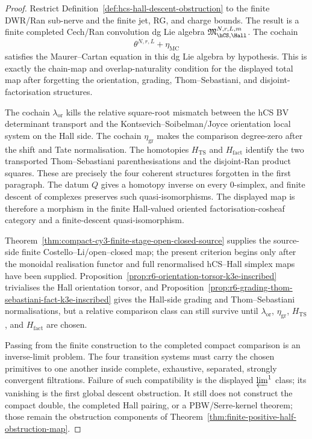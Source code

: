 \begin{proof}
Restrict
Definition~\ref{def:hcs-hall-descent-obstruction} to the finite
DWR/Ran sub-nerve and the finite jet, RG, and charge bounds. The result
is a finite completed Cech/Ran convolution dg Lie algebra
$\mathfrak M_{\hCS,\Hall}^{N,r,L,m}$. The cochain
\[
 \theta^{N,r,L}+\eta_{\mathrm{MC}}
\]
satisfies the Maurer--Cartan equation in this dg Lie algebra by
hypothesis. This is exactly the chain-map and overlap-naturality
condition for the displayed total map after forgetting the orientation,
grading, Thom--Sebastiani, and disjoint-factorisation structures.

The cochain $\lambda_{\mathrm{or}}$ kills the relative square-root
mismatch between the hCS BV determinant transport and the
Kontsevich--Soibelman/Joyce orientation local system on the Hall side.
The cochain $\eta_{\mathrm{gr}}$ makes the comparison degree-zero after
the shift and Tate normalisation. The homotopies $H_{\mathrm{TS}}$ and
$H_{\mathrm{fact}}$ identify the two transported Thom--Sebastiani
parenthesisations and the disjoint-Ran product squares. These are
precisely the four coherent structures forgotten in the first
paragraph. The datum $Q$ gives a homotopy inverse on every
$0$-simplex, and finite descent of complexes preserves such
quasi-isomorphisms. The displayed map is therefore a morphism in the
finite Hall-valued oriented factorisation-cosheaf category and a
finite-descent quasi-isomorphism.

Theorem~\ref{thm:compact-cy3-finite-stage-open-closed-source} supplies
the source-side finite Costello--Li/open--closed map; the present
criterion begins only after the monoidal realisation functor and full
renormalised hCS--Hall simplex maps have been supplied.
Proposition~\ref{prop:r6-orientation-torsor-k3e-inscribed}
trivialises the Hall orientation torsor, and
Proposition~\ref{prop:r6-grading-thom-sebastiani-fact-k3e-inscribed}
gives the Hall-side grading and Thom--Sebastiani normalisations, but a
relative comparison class can still survive until
$\lambda_{\mathrm{or}}$, $\eta_{\mathrm{gr}}$, $H_{\mathrm{TS}}$, and
$H_{\mathrm{fact}}$ are chosen.

Passing from the finite construction to the completed compact comparison
is an inverse-limit problem. The four transition systems must carry the
chosen primitives to one another inside complete, exhaustive, separated,
strongly convergent filtrations. Failure of such compatibility is the
displayed $\varprojlim^1$ class; its vanishing is the first global
descent obstruction. It still does not construct the compact double,
the completed Hall pairing, or a PBW/Serre-kernel theorem; those remain
the obstruction components of
Theorem~\ref{thm:finite-positive-half-obstruction-map}.
\end{proof}

